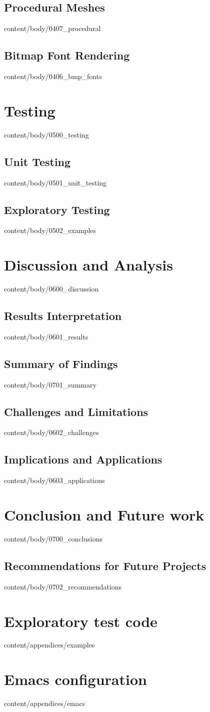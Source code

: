 \documentclass[english, tfg, loc, lof, firstnumbered, epsbased]{tfgtfmthesisuam}
\begin{document}
  \section{Procedural Meshes}{content/body/0407_procedural}                         %
  \section{Bitmap Font Rendering}{content/body/0406_bmp_fonts}                      %

\chapter{Testing}{content/body/0500_testing}                                        %
  \section{Unit Testing}{content/body/0501_unit_testing}                            %
  \section{Exploratory Testing}{content/body/0502_examples}                         %

\chapter{Discussion and Analysis}{content/body/0600_discussion}                     %
  \section{Results Interpretation}{content/body/0601_results}                       %
  \section{Summary of Findings}{content/body/0701_summary}                          %
  \section{Challenges and Limitations}{content/body/0602_challenges}                %
  \section{Implications and Applications}{content/body/0603_applications}           %
  
\chapter{Conclusion and Future work}{content/body/0700_conclusions}                 %
  \section{Recommendations for Future Projects}{content/body/0702_recommendations}  %

\appendix

\chapter{Exploratory test code}{content/appendices/examples}
\chapter{Emacs configuration}{content/appendices/emacs}
\end{document}
